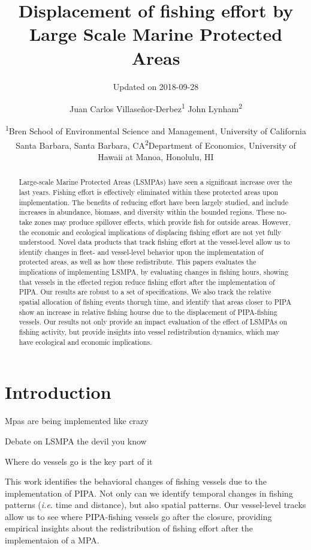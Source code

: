 \documentclass[12pt,]{article}
\title{Displacement of fishing effort by Large Scale Marine Protected Areas}
\subtitle{Updated on 2018-09-28}
\author{Juan Carlos Villaseñor-Derbez\textsuperscript{1} John
Lynham\textsuperscript{2}}
\date{\textsuperscript{1}Bren School of Environmental Science and Management,
University of California Santa Barbara, Santa Barbara,
CA\newline\textsuperscript{2}Department of Economics, University of
Hawaii at Manoa, Honolulu, HI}
\begin{document}
\maketitle
\begin{abstract}
Large-scale Marine Protected Areas (LSMPAs) have seen a significant
increase over the last years. Fishing effort is effectively eliminated
within these protected areas upon implementation. The benefits of
reducing effort have been largely studied, and include increases in
abundance, biomass, and diversity within the bounded regions. These
no-take zones may produce spillover effects, which provide fish for
outside areas. However, the economic and ecological implications of
displacing fishing effort are not yet fully understood. Novel data
products that track fishing effort at the vessel-level allow us to
identify changes in fleet- and vessel-level behavior upon the
implementation of protected areas, as well as how these redistribute.
This papers evaluates the implications of implementing LSMPA, by
evaluating changes in fishing hours, showing that vessels in the
effected region reduce fishing effort after the implementation of PIPA.
Our results are robust to a set of specifications. We also track the
relative spatial allocation of fishing events thorugh time, and identify
that areas closer to PIPA show an increase in relative fishing hourse
due to the displacement of PIPA-fishing vessels. Our results not only
provide an impact evaluation of the effect of LSMPAs on fishing
activity, but provide insights into vessel redistribution dynamics,
which may have ecological and economic implications.
\end{abstract}

\section{Introduction}\label{introduction}

Mpas are being implemented like crazy

Debate on LSMPA the devil you know

Where do vessels go is the key part of it

This work identifies the behavioral changes of fishing vessels due to
the implementation of PIPA. Not only can we identify temporal changes in
fishing patterns (\emph{i.e.} time and distance), but also spatial
patterns. Our vessel-level tracks allow us to see where PIPA-fishing
vessels go after the closure, providing empirical insights about the
redistribution of fishing effort after the implementaion of a MPA.
\end{document}
